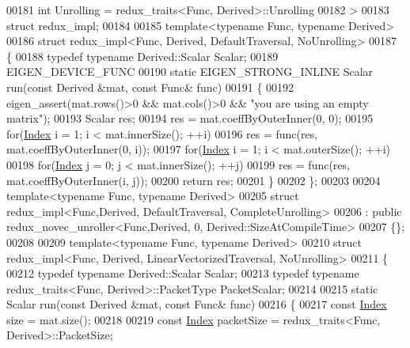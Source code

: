 \begin{DoxyCode}
00181          \textcolor{keywordtype}{int} Unrolling = redux\_traits<Func, Derived>::Unrolling
00182 >
00183 \textcolor{keyword}{struct }redux\_impl;
00184 
00185 \textcolor{keyword}{template}<\textcolor{keyword}{typename} Func, \textcolor{keyword}{typename} Derived>
00186 \textcolor{keyword}{struct }redux\_impl<Func, Derived, DefaultTraversal, NoUnrolling>
00187 \{
00188   \textcolor{keyword}{typedef} \textcolor{keyword}{typename} Derived::Scalar Scalar;
00189   EIGEN\_DEVICE\_FUNC
00190   \textcolor{keyword}{static} EIGEN\_STRONG\_INLINE Scalar run(\textcolor{keyword}{const} Derived &mat, \textcolor{keyword}{const} Func& func)
00191   \{
00192     eigen\_assert(mat.rows()>0 && mat.cols()>0 && \textcolor{stringliteral}{"you are using an empty matrix"});
00193     Scalar res;
00194     res = mat.coeffByOuterInner(0, 0);
00195     \textcolor{keywordflow}{for}(\hyperlink{namespace_eigen_a62e77e0933482dafde8fe197d9a2cfde}{Index} i = 1; i < mat.innerSize(); ++i)
00196       res = func(res, mat.coeffByOuterInner(0, i));
00197     \textcolor{keywordflow}{for}(\hyperlink{namespace_eigen_a62e77e0933482dafde8fe197d9a2cfde}{Index} i = 1; i < mat.outerSize(); ++i)
00198       \textcolor{keywordflow}{for}(\hyperlink{namespace_eigen_a62e77e0933482dafde8fe197d9a2cfde}{Index} j = 0; j < mat.innerSize(); ++j)
00199         res = func(res, mat.coeffByOuterInner(i, j));
00200     \textcolor{keywordflow}{return} res;
00201   \}
00202 \};
00203 
00204 \textcolor{keyword}{template}<\textcolor{keyword}{typename} Func, \textcolor{keyword}{typename} Derived>
00205 \textcolor{keyword}{struct }redux\_impl<Func,Derived, DefaultTraversal, CompleteUnrolling>
00206   : \textcolor{keyword}{public} redux\_novec\_unroller<Func,Derived, 0, Derived::SizeAtCompileTime>
00207 \{\};
00208 
00209 \textcolor{keyword}{template}<\textcolor{keyword}{typename} Func, \textcolor{keyword}{typename} Derived>
00210 \textcolor{keyword}{struct }redux\_impl<Func, Derived, LinearVectorizedTraversal, NoUnrolling>
00211 \{
00212   \textcolor{keyword}{typedef} \textcolor{keyword}{typename} Derived::Scalar Scalar;
00213   \textcolor{keyword}{typedef} \textcolor{keyword}{typename} redux\_traits<Func, Derived>::PacketType PacketScalar;
00214 
00215   \textcolor{keyword}{static} Scalar run(\textcolor{keyword}{const} Derived &mat, \textcolor{keyword}{const} Func& func)
00216   \{
00217     \textcolor{keyword}{const} \hyperlink{namespace_eigen_a62e77e0933482dafde8fe197d9a2cfde}{Index} size = mat.size();
00218     
00219     \textcolor{keyword}{const} \hyperlink{namespace_eigen_a62e77e0933482dafde8fe197d9a2cfde}{Index} packetSize = redux\_traits<Func, Derived>::PacketSize;

\end{DoxyCode}
